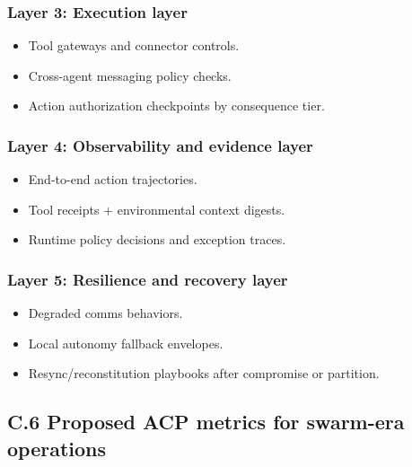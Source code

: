 \documentclass[
]{article}
\providecommand{\tightlist}{%
  \setlength{\itemsep}{0pt}\setlength{\parskip}{0pt}}
\begin{document}
\hypertarget{layer-3-execution-layer}{%
\subsubsection{Layer 3: Execution layer}\label{layer-3-execution-layer}}

\begin{itemize}
\tightlist
\item
  Tool gateways and connector controls.
\item
  Cross-agent messaging policy checks.
\item
  Action authorization checkpoints by consequence tier.
\end{itemize}

\hypertarget{layer-4-observability-and-evidence-layer}{%
\subsubsection{Layer 4: Observability and evidence
layer}\label{layer-4-observability-and-evidence-layer}}

\begin{itemize}
\tightlist
\item
  End-to-end action trajectories.
\item
  Tool receipts + environmental context digests.
\item
  Runtime policy decisions and exception traces.
\end{itemize}

\hypertarget{layer-5-resilience-and-recovery-layer}{%
\subsubsection{Layer 5: Resilience and recovery
layer}\label{layer-5-resilience-and-recovery-layer}}

\begin{itemize}
\tightlist
\item
  Degraded comms behaviors.
\item
  Local autonomy fallback envelopes.
\item
  Resync/reconstitution playbooks after compromise or partition.
\end{itemize}

\hypertarget{c.6-proposed-acp-metrics-for-swarm-era-operations}{%
\subsection{C.6 Proposed ACP metrics for swarm-era
operations}\label{c.6-proposed-acp-metrics-for-swarm-era-operations}}
\end{document}
